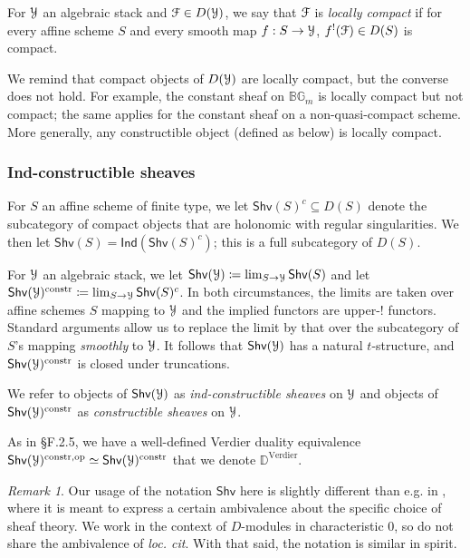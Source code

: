 \documentclass[reqno,11pt]{amsart}
\numberwithin{equation}{subsection}
\theoremstyle{remark}
\newtheorem{rem}[thm]{Remark}
\newcommand{\bB}{{\mathbb B}}
\newcommand{\bD}{{\mathbb D}}
\newcommand{\bG}{{\mathbb G}}
\newcommand{\sF}{{\EuScript F}}
\newcommand{\sY}{{\EuScript Y}}
\newcommand{\on}{\operatorname}
\renewcommand{\lim}{\on{lim}}
\newcommand{\Ind}{\mathsf{Ind}}
\renewcommand{\subset}{\subseteq}
\newcommand{\Shv}{\mathsf{Shv}}
\begin{document}
For $\sY$ an algebraic stack and $\sF \in D(\sY)$, we say
that $\sF$ is \emph{locally compact} if for every
affine scheme $S$ and every smooth map $f:S \to \sY$,
$f^!(\sF) \in D(S)$ is compact.

We remind that compact objects of $D(\sY)$ are 
locally compact, but the converse does not hold. For example, the constant
sheaf on $\bB \bG_m$ is locally compact but not compact; the same
applies for the constant sheaf on a non-quasi-compact scheme.
More generally, any constructible object (defined as below) is locally compact.

\subsubsection{Ind-constructible sheaves}

For $S$ an affine scheme of finite type, 
we let $\Shv(S)^c \subset D(S)$ denote the
subcategory of compact objects that are holonomic with regular singularities.
We then let $\Shv(S) = \Ind(\Shv(S)^c)$; this is a full subcategory
of $D(S)$.

For $\sY$ an algebraic stack, we let 
$\Shv(\sY) \coloneqq \lim_{S \to \sY} \Shv(S)$ and
let $\Shv(\sY)^{\on{constr}} \coloneqq \lim_{S \to \sY} \Shv(S)^c$.
In both circumstances, the limits are taken over affine schemes
$S$ mapping to $\sY$ and the implied functors are upper-$!$ functors.
Standard arguments allow us to replace the limit by that over
the subcategory of $S$'s mapping \emph{smoothly} to $\sY$.
It follows that $\Shv(\sY)$ has a natural $t$-structure,
and $\Shv(\sY)^{\on{constr}}$ is closed under truncations.

We refer to objects of $\Shv(\sY)$ as \emph{ind-constructible sheaves} on $\sY$
and objects of $\Shv(\sY)^{\on{constr}}$ as \emph{constructible sheaves}
on $\sY$. 

As in \cite{agkrrv1} \S F.2.5, we have a well-defined Verdier duality
equivalence $\Shv(\sY)^{\on{constr},\on{op}} \simeq \Shv(\sY)^{\on{constr}}$
that we denote $\bD^{\on{Verdier}}$.

\begin{rem}

Our usage of the notation $\Shv$ 
here is slightly different than e.g. in \cite{agkrrv1}, where
it is meant to express a certain ambivalence about the specific choice
of sheaf theory. We work in the context of $D$-modules in characteristic $0$, 
so do not share the ambivalence of \emph{loc. cit}. With that said,
the notation is similar in spirit.

\end{rem}
\end{document}
